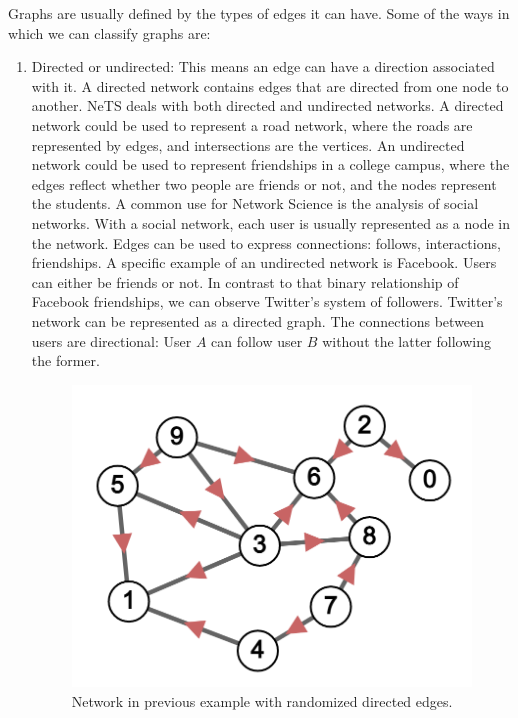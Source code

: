 Graphs are usually defined by the types of edges it can have.
Some of the ways in which we can classify graphs are:
\begin{enumerate}
  \item Directed or undirected: This means an edge can have a direction associated with it.
  A directed network contains edges that are directed from one node to another.
  NeTS deals with both directed and undirected networks.
  A directed network could be used to represent a road network,
  where the roads are represented by edges, and intersections are the vertices.
  An undirected network could be used to represent friendships in a college campus,
  where the edges reflect whether two people are friends or not,
  and the nodes represent the students.
  A common use for Network Science is the analysis of social networks.
  With a social network, each user is usually represented as a node in the network.
  Edges can be used to express connections: follows, interactions, friendships.
  A specific example of an undirected network is Facebook.
  Users can either be friends or not.
  In contrast to that binary relationship of Facebook friendships,
  we can observe Twitter's system of followers.
  Twitter's network can be represented as a directed graph.
  The connections between users are directional:
  User $A$ can follow user $B$ without the latter following the former.

  \begin{figure}[H]
    \centering
    \includegraphics[scale=.25]{img/directed_sample.png}
    \caption{Network in previous example with randomized directed edges.}
    \label{fig:net_di}
  \end{figure}


\end{enumerate}
